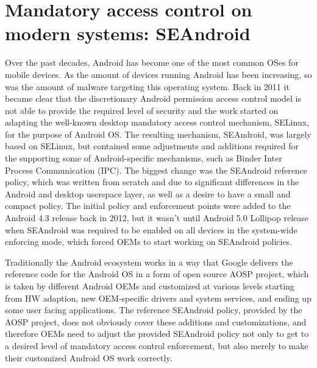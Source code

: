 \section{Mandatory access control on modern systems: SEAndroid}

Over the past decades, Android has become one of the most common OSes for mobile devices. As the amount of devices running Android has been increasing, so was the amount of malware targeting this operating system. Back in 2011 it became clear that the discretionary Android permission access control model is not able to provide the required level of security and the work started on adapting the well-known desktop mandatory access control mechanism, SELinux, for the purpose of Android OS. The resulting mechanism, SEAndroid, was largely based on SELinux, but contained some adjustments and additions required for the supporting some of Android-specific mechanisms, such as Binder Inter Process Communication (IPC). The biggest change was the SEAndroid reference policy, which was written from scratch and due to significant differences in the Android and desktop userspace layer, as well as a desire to have a small and compact policy. The initial policy and enforcement points were added to the Android 4.3 release back in 2012, but it wasn't until Android 5.0 Lollipop release when SEAndroid was required to be enabled on all devices in the system-wide enforcing mode, which forced OEMs to start working on SEAndroid policies. 

Traditionally the Android ecosystem works in a way that Google delivers the reference code for the Android OS in a form of open source AOSP project, which is taken by different Android OEMs and customized at various levels starting from HW adaption, new OEM-specific drivers and system services, and ending up some user facing applications. The reference SEAndroid policy, provided by the AOSP project, does not obviously cover these additions and customizations, and therefore OEMs need to adjust the provided SEAndroid policy not only to get to a desired level of mandatory access control enforcement, but also merely to make their customized Android OS work correctly.


